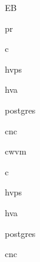 \documentclass[hidelinks, 12pt]{article}%
\begin{document}
            \gls{EB}

            \gls{pr}

            \gls{c}

            \gls{hvps}

            \gls{hva}

            \gls{postgres}

            \gls{cnc}

            \clearpage

            \gls{cwvm}

            \gls{c}

            \gls{hvps}

            \gls{hva}

            \gls{postgres}

            \gls{cnc}

        \clearpage
        \printglossary[type=symbols]
        \printglossary[type=\acronymtype]
        \printglossary[type=main]
\end{document}
